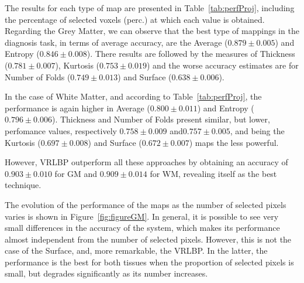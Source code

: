 The results for each type of map are presented in Table~\ref{tab:perfProj}, including the percentage of selected voxels (perc.) at which each value is obtained. Regarding the Grey Matter, we can observe that the best type of mappings in the diagnosis task, in terms of average accuracy, are the Average ($0.879 \pm 0.005$) and Entropy ($0.846 \pm 0.008$). There results are followed by the measures of Thickness ($0.781 \pm 0.007$), Kurtosis ($0.753 \pm 0.019$) and the worse accuracy estimates are for Number of Folds ($0.749 \pm 0.013$) and Surface ($0.638 \pm 0.006$). 

In the case of White Matter, and according to Table~\ref{tab:perfProj}, the performance is again higher in Average ($0.800 \pm 0.011$) and Entropy ($0.796 \pm 0.006$). Thickness and Number of Folds present similar, but lower, perfomance values, respectively $0.758 \pm 0.009$ and$0.757 \pm 0.005$, and being the Kurtosis ($0.697 \pm 0.008$) and Surface ($0.672 \pm 0.007$) maps the less powerful. 

However, VRLBP outperform all these approaches by obtaining an accuracy of $0.903 \pm 0.010$ for \ac{GM} and $0.909 \pm 0.014$ for \ac{WM}, revealing itself as the best technique. 

The evolution of the performance of the maps as the number of selected pixels varies is shown in Figure~\ref{fig:figureGM}. In general, it is possible to see very small differences in the accuracy of the system, which makes its performance almost independent from the number of selected pixels. However, this is not the case of the Surface, and, more remarkable, the VRLBP. In the latter, the performance is the best for both tissues when the proportion of selected pixels is small, but degrades significantly as its number increases. 

